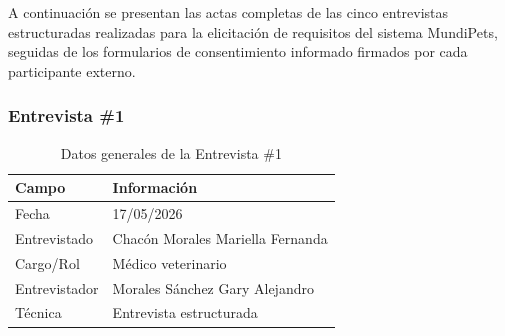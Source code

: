 \documentclass[journal,onecolumn]{IEEEtran}
\begin{document}
A continuación se presentan las actas completas de las cinco entrevistas
estructuradas realizadas para la elicitación de requisitos del sistema
MundiPets, seguidas de los formularios de consentimiento informado firmados
por cada participante externo.

\subsubsection{Entrevista \#1}

\begin{table}[H]
\caption{Datos generales de la Entrevista \#1}
\label{tab:datos_e1}
\begin{tabularx}{\textwidth}{|p{4cm}|X|}
\hline
\textbf{Campo} & \textbf{Información} \\
\hline
Fecha & 17/05/2026 \\
\hline
Entrevistado & Chacón Morales Mariella Fernanda \\
\hline
Cargo/Rol & Médico veterinario \\
\hline
Entrevistador & Morales Sánchez Gary Alejandro \\
\hline
Técnica & Entrevista estructurada \\
\hline
\end{tabularx}
\end{table}
\end{document}
